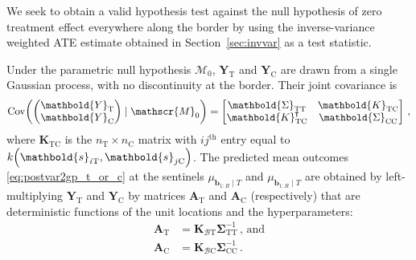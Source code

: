 \documentclass[letter]{article}
\DeclarePairedDelimiter{\parenthesis}{\lparen}{\rparen}
\newcommand{\del}[1]{\parenthesis*{#1}}
\DeclareMathOperator{\cov}{{Cov}}
\newcommand*{\trans}{^{\mkern-1.5mu\intercal}}
\newcommand{\treat}{\mathrm{T}}
\newcommand{\ctrol}{\mathrm{C}}
\newcommand{\svec}{\mathbold{s}}
\newcommand{\Yvec}{\mathbold{Y}}
\newcommand{\yt}{\Yvec_{\treat}}
\newcommand{\yc}{\Yvec_{\ctrol}}
\newcommand{\border}{\mathcal{B}}
\newcommand{\sentinel}{\bm{b}}
\newcommand{\numsent}{R}
\newcommand{\sentinels}{\sentinel_{1:\numsent}}
\newcommand{\modnull}{\mathscr{M}_0}
\newcommand{\Kmat}{\mathbold{K}}
\newcommand{\Amat}{\mathbold{A}}
\newcommand{\SigmaMat}{\mathbold{\Sigma}}
\newcommand{\KBT}{\Kmat_{\border \treat}}
\newcommand{\KBC}{\Kmat_{\border \ctrol}}
\newcommand{\STT}{\SigmaMat_{\treat \treat}}
\newcommand{\SCC}{\SigmaMat_{\ctrol \ctrol}}
\newcommand{\KTC}{\Kmat_{\treat \ctrol}}
\newcommand{\AT}{\Amat_{\treat}}
\newcommand{\AC}{\Amat_{\ctrol}}
\begin{document}
    	\label{sec:calibration}
    


    	We seek to obtain a valid hypothesis test against the null hypothesis of zero treatment effect everywhere along the border by using the inverse-variance weighted ATE estimate obtained in Section~\ref{sec:invvar} as a test statistic.
    


    	Under the parametric null hypothesis \(\modnull\), \(\yt{}\) and \(\yc{}\) are drawn from a single Gaussian process, with no discontinuity at the border.
Their joint covariance is
\begin{equation}
    \cov \del{\begin{pmatrix}\yt{} \\ \yc{}\end{pmatrix} \mid \modnull } 
    = \begin{bmatrix}
        \STT & \KTC \\
        \KTC \trans & \SCC
    \end{bmatrix}\,,
\end{equation}
where \(\KTC\) is the \(n_\treat \times n_\ctrol\) matrix with \(ij^{\mathrm{th}}\) entry equal to \(k\del{\svec_{i\treat},\svec_{j\ctrol}}\).
The predicted mean outcomes \eqref{eq:postvar2gp_t_or_c} at the sentinels \(\mu_{\sentinels \mid T}\) and \(\mu_{\sentinels \mid T}\) are obtained by left-multiplying \(\yt{}\) and \(\yc{}\) by matrices \(\AT{}\) and \(\AC{}\) (respectively) that are deterministic functions of the unit locations and the hyperparameters:
\begin{equation}
\begin{split}
    \AT &= \KBT \STT^{-1} \,\text{, and} \\
    \AC &= \KBC \SCC^{-1}\,.
\end{split}
\end{equation}
    
\end{document}
